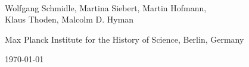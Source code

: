\documentclass[fontsize=11pt, paper=a4, 
DIV15,
normalheadings,
parskip=half-, 
pointlessnumbers]{scrartcl}
\begin{document}
\begin{center}
{} \\[5mm]
\large Wolfgang Schmidle, Martina Siebert, Martin Hofmann, \\[1mm] Klaus Thoden, Malcolm D. Hyman

\normalsize Max Planck Institute for the History of Science, Berlin, Germany

\today
\end{center}


\tableofcontents

\vspace{15mm}

\newcommand{\hash}{{\char"0023}}
\newcommand{\chin}[1]{{\fontspec{SimSun}{#1}}}
\newenvironment{typeChinese}{\begin{alltt}\s\begin{tabular}{@{}l}}{\end{tabular}\end{alltt}}






\end{document}
